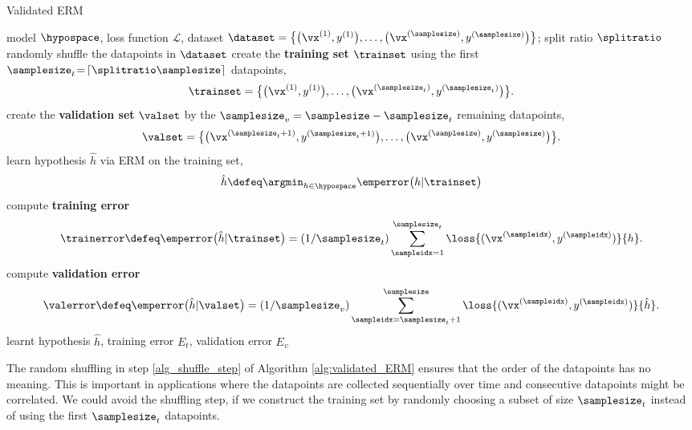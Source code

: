 \documentclass[12pt]{report}
\begin{document}
\begin{algorithm}[htbp]
	\caption{Validated ERM}\label{alg:validated_ERM}
	\begin{algorithmic}[1]
		\renewcommand{\algorithmicrequire}{\textbf{Input:}}
		\renewcommand{\algorithmicensure}{\textbf{Output:}}
		\Require   model $\hypospace$, loss function $\mathcal{L}$, dataset $\dataset=\big\{ \big(\vx^{(1)}, y^{(1)}\big),\ldots,\big(\vx^{(\samplesize)}, y^{(\samplesize)}\big) \big\}$; split ratio $\splitratio$
		\State randomly shuffle the datapoints in $\dataset$ \label{alg_shuffle_step}
		\State create the {\bf training set} $\trainset$ using the first $\samplesize_{t}\!=\! \lceil\splitratio \samplesize\rceil$ datapoints,
		$$\trainset = \big\{ \big(\vx^{(1)}, y^{(1)}\big),\ldots,\big(\vx^{(\samplesize_{t})}, y^{(\samplesize_{t})}\big) \big\}.$$
		\State create the {\bf validation set} $\valset$ by the $\samplesize_v = \samplesize - \samplesize_t$ remaining datapoints, 
		$$\valset = \big\{ \big(\vx^{(\samplesize_{t}+1)}, y^{(\samplesize_{t}+1)}\big),\ldots,\big(\vx^{(\samplesize)}, y^{(\samplesize)}\big) \big\}.$$
		\State  learn hypothesis $\hat{h}$ via ERM on the training set, 
		\begin{equation} 
		\label{equ_def_hat_h_fitting}
		\hat{h} \defeq \argmin_{h\in \hypospace} \emperror\big(h| \trainset \big)
		\end{equation} 
		\State compute {\bf training error}
		\begin{equation} 
		\label{equ_def_training_error_val}
		\trainerror \defeq \emperror\big(\hat{h}| \trainset \big) = (1/\samplesize_{t}) \sum_{\sampleidx=1}^{\samplesize_{t}} \loss{(\vx^{(\sampleidx)},y^{(\sampleidx)})}{h}. 
		\end{equation} 
		\State compute {\bf validation error}
		\begin{equation} 
		\label{equ_def_training_val_val}
		\valerror \defeq \emperror\big(\hat{h}| \valset \big)=   (1/\samplesize_{v}) \sum_{\sampleidx=\samplesize_{t}+1}^{\samplesize} \loss{(\vx^{(\sampleidx)},y^{(\sampleidx)})}{\hat{h}}. 
		\end{equation} 
		\Ensure learnt hypothesis $\hat{h}$, training error $E_{t}$, validation error $E_{v}$
	\end{algorithmic}
\end{algorithm}
The random shuffling in step \ref{alg_shuffle_step} of Algorithm \ref{alg:validated_ERM} ensures that the order 
of the datapoints has no meaning. This is important in applications where the 
datapoints are collected sequentially over time and consecutive datapoints might 
be correlated. We could avoid the shuffling step, if we construct the training set 
by randomly choosing a subset of size $\samplesize_{t}$ instead of using the 
first $\samplesize_{t}$ datapoints. 
\end{document}

